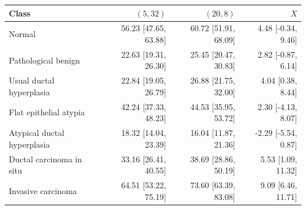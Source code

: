 \begin{tabular}{@{}p{6cm}rrr@{}}
\toprule
Class & $(5, 32)$ & $(20, 8)$ & $X$ \\
\midrule
Normal & 56.23 [47.65, 63.88] & 60.72 [51.91, 68.09] & 4.48 [-0.34, 9.46] \\
Pathological benign & 22.63 [19.31, 26.30] & 25.45 [20.47, 30.83] & 2.82 [-0.87, 6.14] \\
Usual ductal hyperplasia & 22.84 [19.05, 26.79] & 26.88 [21.75, 32.00] & 4.04 [0.38, 8.44] \\
Flat epithelial atypia & 42.24 [37.33, 48.23] & 44.53 [35.95, 53.72] & 2.30 [-4.13, 8.07] \\
Atypical ductal hyperplasia & 18.32 [14.04, 23.39] & 16.04 [11.87, 21.36] & -2.29 [-5.54, 0.87] \\
Ductal carcinoma in situ & 33.16 [26.41, 40.55] & 38.69 [28.86, 50.19] & 5.53 [1.09, 11.32] \\
Invasive carcinoma & 64.51 [53.22, 75.19] & 73.60 [63.39, 83.08] & 9.09 [6.46, 11.71] \\
\bottomrule
\end{tabular}
